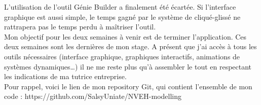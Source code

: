 \documentclass[a4paper, french, 12pt, titlepage]{article}
\begin{document}
L’utilisation de l’outil Génie Builder a finalement été écartée. Si l’interface graphique est aussi simple, le temps gagné par le système de cliqué-glissé ne rattrapera pas le temps perdu à maîtriser l’outil. \\

Mon objectif pour les deux semaines à venir est de terminer l’application. Ces deux semaines sont les dernières de mon stage. A présent que j’ai accès à tous les outils nécessaires (interface graphique, graphiques interactifs, animations de systèmes dynamiques…) il ne me reste plus qu’à assembler le tout en respectant les indications de ma tutrice entreprise.\\
 
Pour rappel, voici le lien de mon repository Git, qui contient l’ensemble de mon code : https://github.com/SalsyUniate/NVEH-modelling 
\end{document}
